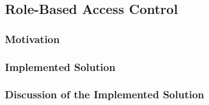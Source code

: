 \subsection{Role-Based Access Control}

\subsubsection{Motivation}

\subsubsection{Implemented Solution}

\subsubsection{Discussion of the Implemented Solution}